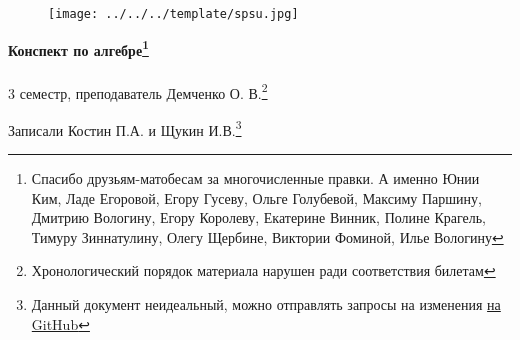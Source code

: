 \documentclass[main]{subfiles}
\begin{document}
	\begin{figure}[H]
			\texttt{[image: ../../../template/spsu.jpg]}
			\centering
	\end{figure}
	\vspace*{\fill}
	\begin{center}
		\huge \textbf{Конспект по алгебре\footnote{Спасибо друзьям-матобесам за многочисленные правки. А именно Юнии Ким, Ладе Егоровой, Егору Гусеву, Ольге Голубевой, Максиму Паршину, Дмитрию Вологину, Егору Королеву, Екатерине Винник, Полине Крагель, Тимуру Зиннатулину, Олегу Щербине, Виктории Фоминой, Илье Вологину}}\\ \ \\
		\Large 3 семестр, преподаватель Демченко О. В.\footnote{Хронологический порядок материала нарушен ради соответствия билетам}

		\large Записали Костин П.А. и Щукин И.В.\footnote{Данный документ неидеальный, можно отправлять запросы на изменения \href{https://github.com/KostinP/Mathematical-LecturesAndPractices}{на GitHub}}
	\end{center}
	\vspace*{\fill}
	\vspace*{\fill}

	\newpage
	\tableofcontents
	\newpage
\end{document}
